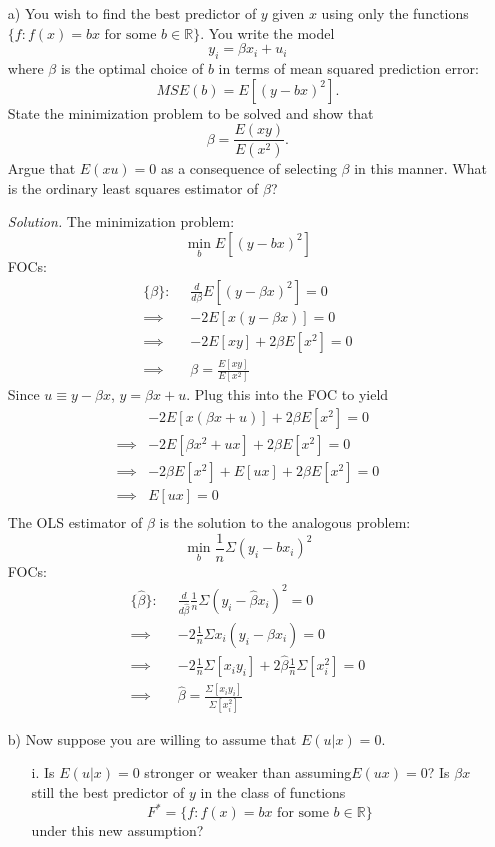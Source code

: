 \documentclass[
]{article}
\begin{document}
\begin{enumerate} 
\item[a)] You wish to find the best predictor of $y$ given $x$ using only the functions $\{f : f (x) = bx \text{ for some } b \in \mathbb{R}\}$. You write the model 
\[y_i = \beta x_i + u_i\] 
where $\beta$ is the optimal choice of $b$ in terms of mean squared prediction error:
\[MSE(b) = E[(y-bx)^2].\]
State the minimization problem to be solved and show that
\[\beta = \frac{E(xy)}{E(x^2)}.\]
Argue that $E (xu) = 0$ as a consequence of selecting $\beta$ in this manner. What is the ordinary least squares estimator of $\beta$?  
  
\textit{Solution.}  
The minimization problem: 
\[\min _ b E[(y-bx)^2]\]
FOCs: 
\[\begin{aligned}
\{\beta\}: \; \; &\frac{d}{d\beta} E[(y-\beta x)^2] = 0\\
\implies& -2E[x(y-\beta x)] = 0  \\
\implies& -2 E[xy] + 2 \beta E[x^2] = 0 \\
\implies& \beta = \frac{E[xy]}{E[x^2]}
\end{aligned}\]
Since $u \equiv y - \beta x$, $y = \beta x + u$. Plug this into the FOC to yield 
\[\begin{aligned} 
&-2 E[x(\beta x + u) ] + 2 \beta E[x^2] = 0\\ 
\implies& -2 E[\beta x^2 + ux ] + 2 \beta E[x^2] = 0 \\
\implies& -2\beta E[x^2] + E[ux ] + 2 \beta E[x^2] = 0 \\
\implies& E[ux ]  = 0 \\
\end{aligned}\]
The OLS estimator of $\beta$ is the solution to the analogous problem:
\[\min _ b \frac{1}{n}\Sigma(y_i-bx_i)^2\]
FOCs: 
\[\begin{aligned}
\{\hat{\beta}\}: \; \; &\frac{d}{d\hat{\beta}} \frac{1}{n}\Sigma(y_i-\hat{\beta} x_i)^2 = 0\\
\implies& -2\frac{1}{n}\Sigma x_i(y_i-\hat{\beta} x_i) = 0  \\
\implies& -2 \frac{1}{n}\Sigma [x_iy_i] + 2 \hat{\beta} \frac{1}{n}\Sigma [x_i^2] = 0 \\
\implies& \hat{\beta}= \frac{\Sigma [x_iy_i]}{\Sigma [x_i^2]}
\end{aligned}\]

\item[b)] Now suppose you are willing to assume that $E(u|x) = 0$.  
\begin{enumerate} 
\item[i.] Is $E(u|x) = 0$ stronger or weaker than assuming$E(ux) = 0$? Is $\beta x$ still the best predictor of $y$ in the class of functions 
\[F^* = \{f : f (x) = bx \text{ for some } b \in \mathbb{R}\}\]
under this new assumption?  
  

\end{enumerate}
\end{enumerate}
\end{document}
